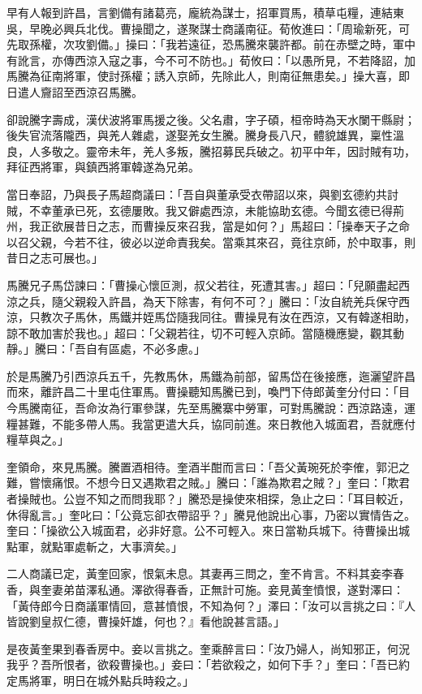 早有人報到許昌，言劉備有諸葛亮，龐統為謀士，招軍買馬，積草屯糧，連結東吳，早晚必興兵北伐。曹操聞之，遂聚謀士商議南征。荀攸進曰：「周瑜新死，可先取孫權，次攻劉備。」操曰：「我若遠征，恐馬騰來襲許都。前在赤壁之時，軍中有訛言，亦傳西涼入寇之事，今不可不防也。」荀攸曰：「以愚所見，不若降詔，加馬騰為征南將軍，使討孫權；誘入京師，先除此人，則南征無患矣。」操大喜，即日遣人齎詔至西涼召馬騰。

卻說騰字壽成，漢伏波將軍馬援之後。父名肅，字子碩，桓帝時為天水闌干縣尉；後失官流落隴西，與羌人雜處，遂娶羌女生騰。騰身長八尺，體貌雄異，稟性溫良，人多敬之。靈帝未年，羌人多叛，騰招募民兵破之。初平中年，因討賊有功，拜征西將軍，與鎮西將軍韓遂為兄弟。

當日奉詔，乃與長子馬超商議曰：「吾自與董承受衣帶詔以來，與劉玄德約共討賊，不幸董承已死，玄德屢敗。我又僻處西涼，未能協助玄德。今聞玄德已得荊州，我正欲展昔日之志，而曹操反來召我，當是如何？」馬超曰：「操奉天子之命以召父親，今若不往，彼必以逆命責我矣。當乘其來召，竟往京師，於中取事，則昔日之志可展也。」

馬騰兄子馬岱諫曰：「曹操心懷叵測，叔父若往，死遭其害。」超曰：「兒願盡起西涼之兵，隨父親殺入許昌，為天下除害，有何不可？」騰曰：「汝自統羌兵保守西涼，只教次子馬休，馬鐵并姪馬岱隨我同往。曹操見有汝在西涼，又有韓遂相助，諒不敢加害於我也。」超曰：「父親若往，切不可輕入京師。當隨機應變，觀其動靜。」騰曰：「吾自有區處，不必多慮。」

於是馬騰乃引西涼兵五千，先教馬休，馬鐵為前部，留馬岱在後接應，迤灑望許昌而來，離許昌二十里屯住軍馬。曹操聽知馬騰已到，喚門下侍郎黃奎分付曰：「目今馬騰南征，吾命汝為行軍參謀，先至馬騰寨中勞軍，可對馬騰說：西涼路遠，運糧甚難，不能多帶人馬。我當更遣大兵，協同前進。來日教他入城面君，吾就應付糧草與之。」

奎領命，來見馬騰。騰置酒相待。奎酒半酣而言曰：「吾父黃琬死於李傕，郭汜之難，嘗懷痛恨。不想今日又遇欺君之賊。」騰曰：「誰為欺君之賊？」奎曰：「欺君者操賊也。公豈不知之而問我耶？」騰恐是操使來相探，急止之曰：「耳目較近，休得亂言。」奎叱曰：「公竟忘卻衣帶詔乎？」騰見他說出心事，乃密以實情告之。奎曰：「操欲公入城面君，必非好意。公不可輕入。來日當勒兵城下。待曹操出城點軍，就點軍處斬之，大事濟矣。」

二人商議已定，黃奎回家，恨氣未息。其妻再三問之，奎不肯言。不料其妾李春香，與奎妻弟苗澤私通。澤欲得春香，正無計可施。妾見黃奎憤恨，遂對澤曰：「黃侍郎今日商議軍情回，意甚憤恨，不知為何？」澤曰：「汝可以言挑之曰：『人皆說劉皇叔仁德，曹操奸雄，何也？』看他說甚言語。」

是夜黃奎果到春香房中。妾以言挑之。奎乘醉言曰：「汝乃婦人，尚知邪正，何況我乎？吾所恨者，欲殺曹操也。」妾曰：「若欲殺之，如何下手？」奎曰：「吾已約定馬將軍，明日在城外點兵時殺之。」


